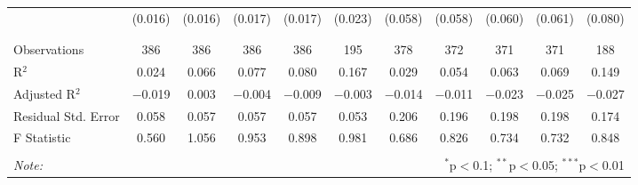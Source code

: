 \begin{table}[H]
\begin{tabular}{@{\extracolsep{4pt}}lcccccccccc}
  & (0.016) & (0.016) & (0.017) & (0.017) & (0.023) & (0.058) & (0.058) & (0.060) & (0.061) & (0.080) \\ 
  & & & & & & & & & & \\ 
\hline \\[-1.8ex] 
Observations & 386 & 386 & 386 & 386 & 195 & 378 & 372 & 371 & 371 & 188 \\ 
R$^{2}$ & 0.024 & 0.066 & 0.077 & 0.080 & 0.167 & 0.029 & 0.054 & 0.063 & 0.069 & 0.149 \\ 
Adjusted R$^{2}$ & $-$0.019 & 0.003 & $-$0.004 & $-$0.009 & $-$0.003 & $-$0.014 & $-$0.011 & $-$0.023 & $-$0.025 & $-$0.027 \\ 
Residual Std. Error & 0.058 & 0.057 & 0.057 & 0.057 & 0.053 & 0.206 & 0.196 & 0.198 & 0.198 & 0.174 \\ 
F Statistic & 0.560 & 1.056 & 0.953 & 0.898 & 0.981 & 0.686 & 0.826 & 0.734 & 0.732 & 0.848 \\ 
\hline 
\hline \\[-1.8ex] 
\textit{Note:}  & \multicolumn{10}{r}{$^{*}$p$<$0.1; $^{**}$p$<$0.05; $^{***}$p$<$0.01} \\ 
\end{tabular} 
\end{table} 
